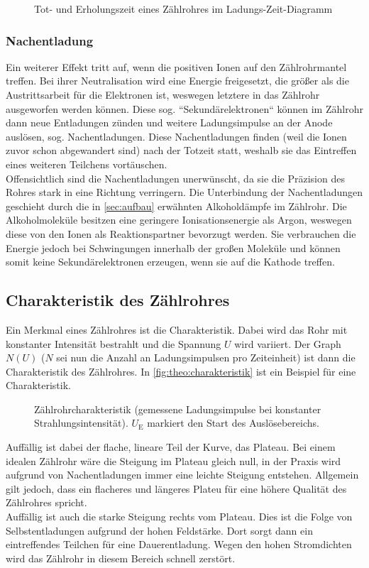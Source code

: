 \begin{figure}[H]
	\centering
	\caption{Tot- und Erholungszeit eines Zählrohres im Ladungs-Zeit-Diagramm \cite{sample}}
	\label{fig:totzeit}
\end{figure}
\subsubsection{Nachentladung}
\label{sec:nachentladung}
Ein weiterer Effekt tritt auf, wenn die positiven Ionen auf den Zählrohrmantel treffen. Bei ihrer Neutralisation wird
eine Energie freigesetzt, die größer als die Austrittsarbeit für die Elektronen ist, weswegen letztere in das Zählrohr
ausgeworfen werden können. Diese sog. ``Sekundärelektronen`` können im Zählrohr dann neue Entladungen zünden und 
 weitere Ladungsimpulse an der Anode auslösen, sog. Nachentladungen. Diese Nachentladungen finden (weil die
Ionen zuvor schon abgewandert sind) nach der Totzeit statt, weshalb sie das Eintreffen eines weiteren Teilchens 
vortäuschen.
\\
Offensichtlich sind die Nachentladungen unerwünscht, da sie die Präzision des Rohres stark in eine Richtung verringern.
Die Unterbindung der Nachentladungen geschieht durch die in \autoref{sec:aufbau} erwähnten Alkoholdämpfe im 
Zählrohr. Die Alkoholmoleküle besitzen eine geringere Ionisationsenergie als Argon, weswegen diese von den Ionen als 
Reaktionspartner bevorzugt werden. Sie verbrauchen die Energie 
jedoch bei Schwingungen innerhalb der großen Moleküle und können somit keine Sekundärelektronen erzeugen, wenn sie 
auf die Kathode treffen.
\subsection{Charakteristik des Zählrohres}
\label{sec:theo:charakteristik}
Ein Merkmal eines Zählrohres ist die Charakteristik. Dabei wird das Rohr mit konstanter Intensität bestrahlt und
die Spannung $U$ wird variiert. Der Graph $N(U)$ ($N$ sei nun die Anzahl an Ladungsimpulsen pro Zeiteinheit) ist dann
die Charakteristik des Zählrohres. In
\autoref{fig:theo:charakteristik} ist ein Beispiel für eine Charakteristik.
\begin{figure}[H]
	\centering
	\caption{Zählrohrcharakteristik (gemessene Ladungsimpulse bei konstanter Strahlungsintensität). $U_\text{E}$
	markiert den Start des Auslösebereichs. \cite{sample}}
	\label{fig:theo:charakteristik}
\end{figure}
\noindent
Auffällig ist dabei der flache, lineare Teil der Kurve, das Plateau. Bei einem idealen Zählrohr wäre die Steigung
im Plateau gleich null, in der Praxis wird aufgrund von Nachentladungen immer eine leichte Steigung entstehen. 
Allgemein gilt
jedoch, dass ein flacheres und längeres Plateu für eine höhere Qualität des Zählrohres spricht.
\\
Auffällig ist auch die starke Steigung rechts vom Plateau. Dies ist die Folge von Selbstentladungen aufgrund 
der hohen Feldstärke. Dort sorgt dann ein eintreffendes Teilchen für eine Dauerentladung. Wegen den hohen Stromdichten
wird das Zählrohr in diesem Bereich schnell zerstört.
